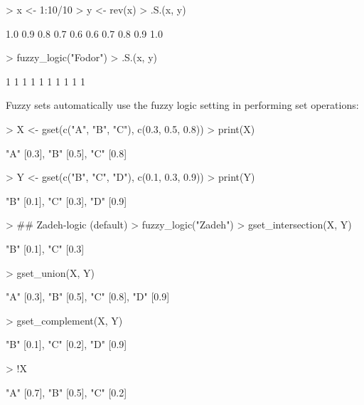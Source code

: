 \documentclass[article]{jss}
\begin{document}
\begin{Schunk}
\begin{Sinput}
> x <- 1:10/10
> y <- rev(x)
> .S.(x, y)
\end{Sinput}
\begin{Soutput}
 [1] 1.0 0.9 0.8 0.7 0.6 0.6 0.7 0.8 0.9 1.0
\end{Soutput}
\begin{Sinput}
> fuzzy_logic("Fodor")
> .S.(x, y)
\end{Sinput}
\begin{Soutput}
 [1] 1 1 1 1 1 1 1 1 1 1
\end{Soutput}
\end{Schunk}
Fuzzy sets automatically use the fuzzy logic setting in
performing set operations:
\begin{Schunk}
\begin{Sinput}
> X <- gset(c("A", "B", "C"), c(0.3, 0.5, 0.8))
> print(X)
\end{Sinput}
\begin{Soutput}
{"A" [0.3], "B" [0.5], "C" [0.8]}
\end{Soutput}
\begin{Sinput}
> Y <- gset(c("B", "C", "D"), c(0.1, 0.3, 0.9))
> print(Y)
\end{Sinput}
\begin{Soutput}
{"B" [0.1], "C" [0.3], "D" [0.9]}
\end{Soutput}
\begin{Sinput}
> ## Zadeh-logic (default)
> fuzzy_logic("Zadeh")
> gset_intersection(X, Y)
\end{Sinput}
\begin{Soutput}
{"B" [0.1], "C" [0.3]}
\end{Soutput}
\begin{Sinput}
> gset_union(X, Y)
\end{Sinput}
\begin{Soutput}
{"A" [0.3], "B" [0.5], "C" [0.8], "D" [0.9]}
\end{Soutput}
\begin{Sinput}
> gset_complement(X, Y)
\end{Sinput}
\begin{Soutput}
{"B" [0.1], "C" [0.2], "D" [0.9]}
\end{Soutput}
\begin{Sinput}
> !X
\end{Sinput}
\begin{Soutput}
{"A" [0.7], "B" [0.5], "C" [0.2]}
\end{Soutput}
\begin{Sinput}

\end{Sinput}
\end{Schunk}
\end{document}
